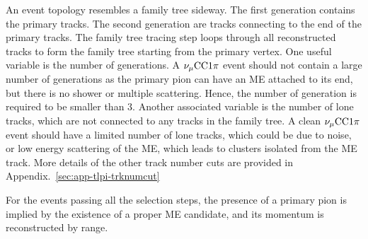             An event topology resembles a family tree sideway. 
            The first generation contains the primary tracks.
            The second generation are tracks connecting to the end of the primary tracks.
            The family tree tracing step loops through all reconstructed tracks to form the family tree starting from the primary vertex.
            One useful variable is the number of generations.
            A $\nu_{\mu}\textrm{CC}1\pi$ event should not contain a large number of generations as the primary pion can have an ME attached to its end, but there is no shower or multiple scattering.
            Hence, the number of generation is required to be smaller than $3$.
            Another associated variable is the number of lone tracks, which are not connected to any tracks in the family tree. 
            A clean $\nu_{\mu}\textrm{CC}1\pi$ event should have a limited number of lone tracks, which could be due to noise, or low energy scattering of the ME, which leads to clusters isolated from the ME track. 
            More details of the other track number cuts are provided in Appendix.~\ref{sec:app-tlpi-trknumcut}
        
            For the events passing all the selection steps, the presence of a primary pion is implied by the existence of a proper ME candidate, and its momentum is reconstructed by range. 

